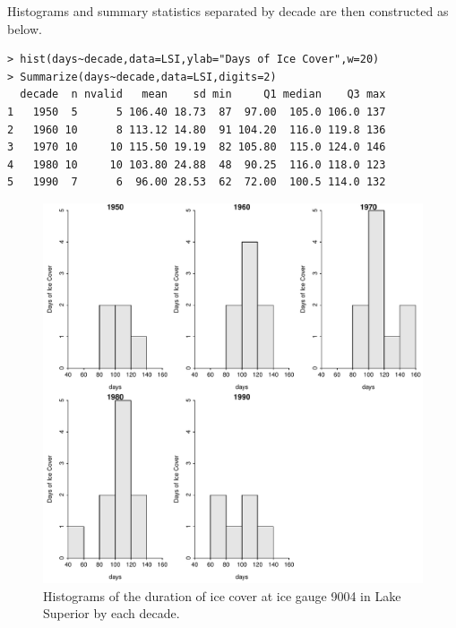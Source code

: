 \documentclass[10pt,openany]{book}\usepackage[]{graphicx}\usepackage[]{color}
\makeatletter
\newenvironment{kframe}{%
 \def\at@end@of@kframe{}%
 \ifinner\ifhmode%
  \def\at@end@of@kframe{\end{minipage}}%
  \begin{minipage}{\columnwidth}%
 \fi\fi%
 \def\FrameCommand##1{\hskip\@totalleftmargin \hskip-\fboxsep
 \colorbox{shadecolor}{##1}\hskip-\fboxsep
     \hskip-\linewidth \hskip-\@totalleftmargin \hskip\columnwidth}%
 \MakeFramed {\advance\hsize-\width
   \@totalleftmargin\z@ \linewidth\hsize
   \@setminipage}}%
 {\par\unskip\endMakeFramed%
 \at@end@of@kframe}
\newenvironment{knitrout}{}{} %
\makeatother
\begin{document}
Histograms  and summary statistics separated by decade are then constructed as below.
\begin{knitrout}
\color{fgcolor}\begin{kframe}
\begin{verbatim}
> hist(days~decade,data=LSI,ylab="Days of Ice Cover",w=20)
> Summarize(days~decade,data=LSI,digits=2)
  decade  n nvalid   mean    sd min     Q1 median    Q3 max
1   1950  5      5 106.40 18.73  87  97.00  105.0 106.0 137
2   1960 10      8 113.12 14.80  91 104.20  116.0 119.8 136
3   1970 10     10 115.50 19.19  82 105.80  115.0 124.0 146
4   1980 10     10 103.80 24.88  48  90.25  116.0 118.0 123
5   1990  7      6  96.00 28.53  62  72.00  100.5 114.0 132
\end{verbatim}
\end{kframe}\begin{figure}[hbtp]

{\centering \includegraphics[width=.8\linewidth]{Figs/mhist1-1} 

}

\caption[Histograms of the duration of ice cover at ice gauge 9004 in Lake Superior by each decade]{Histograms of the duration of ice cover at ice gauge 9004 in Lake Superior by each decade.}\label{fig:mhist1}
\end{figure}


\end{knitrout}
\end{document}
